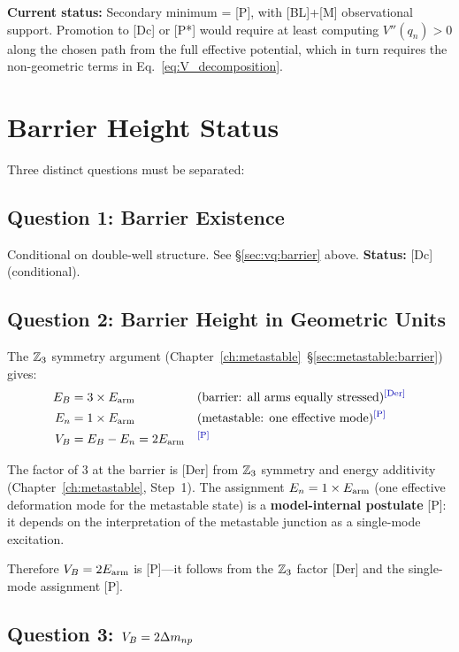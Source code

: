 \textbf{Current status:} Secondary minimum = [P], with [BL]+[M]
observational support. Promotion to [Dc] or [P*] would require at least
computing $V''(q_n) > 0$ along the chosen path from the full effective
potential, which in turn requires the non-geometric terms in
Eq.~\eqref{eq:V_decomposition}.

\section{Barrier Height Status}
\label{sec:vq:height}

Three distinct questions must be separated:

\subsection{Question 1: Barrier Existence}

Conditional on double-well structure. See \S\ref{sec:vq:barrier} above.
\textbf{Status:} [Dc] (conditional).

\subsection{Question 2: Barrier Height in Geometric Units}

The $\mathbb{Z}_3$ symmetry argument
(Chapter~\ref{ch:metastable}~\S\ref{sec:metastable:barrier}) gives:
\begin{align}
    E_B &= 3 \times \Earm & &\text{(barrier: all arms equally stressed)} \tagDer \\
    E_n &= 1 \times \Earm & &\text{(metastable: one effective mode)} \tagP \\
    \VB &= E_B - E_n = 2\Earm & &\tagP
    \label{eq:VB_2Earm_app}
\end{align}

The factor of 3 at the barrier is [Der] from $\mathbb{Z}_3$ symmetry and energy
additivity (Chapter~\ref{ch:metastable}, Step~1). The assignment $E_n = 1 \times E_{\text{arm}}$
(one effective deformation mode for the metastable state) is a
\textbf{model-internal postulate} [P]: it depends on the interpretation
of the metastable junction as a single-mode excitation.

Therefore $V_B = 2E_{\text{arm}}$ is [P]---it follows from the $\mathbb{Z}_3$ factor
[Der] and the single-mode assignment [P].

\subsection{Question 3: $V_B = 2\Delta m_{np}$}

